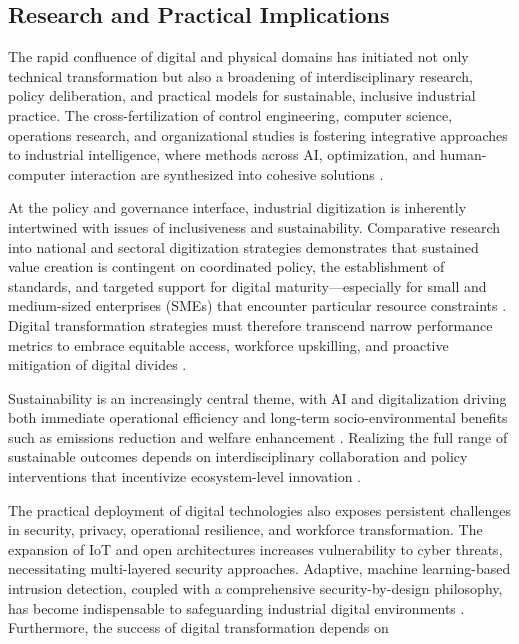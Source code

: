 \subsection{Research and Practical Implications}

The rapid confluence of digital and physical domains has initiated not only technical transformation but also a broadening of interdisciplinary research, policy deliberation, and practical models for sustainable, inclusive industrial practice. The cross-fertilization of control engineering, computer science, operations research, and organizational studies is fostering integrative approaches to industrial intelligence, where methods across AI, optimization, and human-computer interaction are synthesized into cohesive solutions \cite{ref41}\cite{ref86}.

At the policy and governance interface, industrial digitization is inherently intertwined with issues of inclusiveness and sustainability. Comparative research into national and sectoral digitization strategies demonstrates that sustained value creation is contingent on coordinated policy, the establishment of standards, and targeted support for digital maturity—especially for small and medium-sized enterprises (SMEs) that encounter particular resource constraints \cite{ref21}\cite{ref23}. Digital transformation strategies must therefore transcend narrow performance metrics to embrace equitable access, workforce upskilling, and proactive mitigation of digital divides \cite{ref91}.

Sustainability is an increasingly central theme, with AI and digitalization driving both immediate operational efficiency and long-term socio-environmental benefits such as emissions reduction and welfare enhancement \cite{ref90}. Realizing the full range of sustainable outcomes depends on interdisciplinary collaboration and policy interventions that incentivize ecosystem-level innovation \cite{ref88}.

The practical deployment of digital technologies also exposes persistent challenges in security, privacy, operational resilience, and workforce transformation. The expansion of IoT and open architectures increases vulnerability to cyber threats, necessitating multi-layered security approaches. Adaptive, machine learning-based intrusion detection, coupled with a comprehensive security-by-design philosophy, has become indispensable to safeguarding industrial digital environments \cite{ref10}\cite{ref92}. Furthermore, the success of digital transformation depends on

